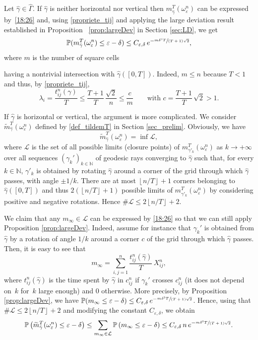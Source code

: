 \documentclass[JEP,XML,SOM,Unicode, NoEqCountersInSection,NoFloatCountersInSection,published]{cedram}
\def\N{\mathbb{N}}
\theoremstyle{definition}
\begin{document}
Let $\hat \gamma\in\hat \Gamma$.
{If $\hat \gamma$ is neither horizontal nor vertical then $m_{\hat \gamma}^T(\omega_\varepsilon^n) $ can be expressed by~\eqref{18:26} and, using \eqref{propriete_tij} and} applying the large deviation result established in Proposition~ \ref{prop:largeDev} in Section \ref{sec:LD}, we get
\[
\mathbb{P}( m_{\hat \gamma}^T(\omega_\varepsilon^n) \leq \varepsilon-\delta) \leq C_{\varepsilon, \delta} \, {e^{-\sfrac{m \delta^2 T}{(T+1)\sqrt{2}}} },
\]
where $m$ is the number of square cells {having a nontrivial intersection with $\hat \gamma([0,T])$. Indeed, $m\leq n$ because $T<1$ and thus, by \eqref{propriete_tij},
\[
\lambda_i = \frac{t_{ij}^n(\gamma)}{T} \leq \frac{T+1}{T}\,\frac{\sqrt{2}}{n} \leq \frac{c}{m}\qquad\text{with }c=\frac{T+1}{T}\,\sqrt{2} > 1.
\]

If $\hat \gamma$ is horizontal or vertical, the argument is more complicated.
We consider $\widetilde m^T_{\hat \gamma}(\omega_\varepsilon^n)$ defined by \eqref{def_tildemT} in Section \ref{sec_prelim}. Obviously, we have
\[
\widetilde m^T_{\hat \gamma}(\omega_\varepsilon^n) = \inf \mathcal{L},
\]
where $\mathcal{L}$ is the set of all possible limits (closure points) of $m^T_{\gamma'_k}(\omega_\varepsilon^n)$ as $k\rightarrow+\infty$ over all sequences $(\gamma_k')_{k\in \N}$ of geodesic rays converging to $\hat \gamma$ such that, for every $k\in\N$, $\gamma'_k$ is obtained by rotating $\hat \gamma$ around a corner of the grid through which $\hat \gamma$ passes, with angle $\pm 1/k$.
There are at most $\left \lfloor n/T\right \rfloor +1$ corners belonging to $\hat \gamma([0,T])$ and thus $2(\left \lfloor n/T\right \rfloor+1)$ possible limits of $m^T_{\gamma'_k}(\omega_\varepsilon^n)$ by considering positive and negative rotations. Hence $\#\mathcal{L} \leq 2\left \lfloor n/T\right \rfloor+2$.

We claim that any $m_\infty\in\mathcal{L}$ can be expressed by \eqref{18:26} so that we can still apply Proposition \ref{prop:largeDev}. Indeed, assume for instance that $\gamma_k'$ is obtained from $\hat \gamma$ by a rotation of angle $1/k$ around a corner $c$ of the grid through which $\hat \gamma$ passes.
Then, it is easy to see that
\[
m_\infty = \sum_{i,j=1}^n \frac{t_{ij}^n(\hat \gamma)}{T}\, X_{ij}^n,
\]
where $t_{ij}^n(\hat \gamma)$ is the time spent by $\hat\gamma$ in $c_{ij}^n$ if $\gamma_k'$ crosses $c_{ij}^n$ (it does not depend on~$k$ for~$k$ large enough) and $0$ otherwise. More precisely, by Proposition \ref{prop:largeDev}, we have
\hbox{$\mathbb{P}( m_\infty \leq \varepsilon-\delta) \leq C_{\varepsilon, \delta} \, {e^{-\sfrac{m \delta^2 T}{(T+1)\sqrt{2}}}}$}.
Hence, using that $\#\mathcal{L} \leq 2\left \lfloor n/T\right \rfloor+2$ and modifying the constant $ C_{\varepsilon, \delta}$, we obtain
\[
\mathbb{P}\left( \widetilde m_{\hat \gamma}^T(\omega_\varepsilon^n ) \leq \varepsilon-\delta \right)
\leq \sum_{m_\infty \in \mathcal{L}} \mathbb{P}\left(m_\infty \leq \varepsilon-\delta \right) \leq C_{\varepsilon, \delta} \, n \, {e^{-\sfrac{m \delta^2 T}{(T+1)\sqrt{2}}} }.
\]

}
\end{document}
